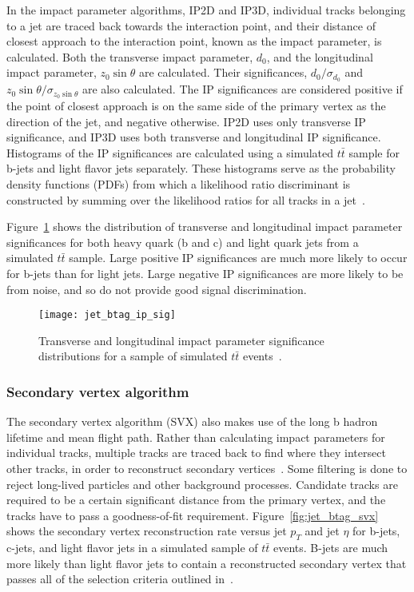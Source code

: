 In the impact parameter algorithms, IP2D and IP3D, individual tracks belonging to a jet are traced back towards the interaction point, and their distance of closest approach to the interaction point, known as the impact parameter, is calculated.
Both the transverse impact parameter, $d_0$, and the longitudinal impact parameter, $z_0 \sin\theta$ are calculated.
Their significances, $d_0/ \sigma_{d_0}$ and $z_0 \sin\theta / \sigma_{z_0 \sin\theta}$ are also calculated.
The IP significances are considered positive if the point of closest approach is on the same side of the primary vertex as the direction of the jet, and negative otherwise.
IP2D uses only transverse IP significance, and IP3D uses both transverse and longitudinal IP significance.
Histograms of the IP significances are calculated using a simulated $t\bar{t}$ sample for b-jets and light flavor jets separately.
These histograms serve as the probability density functions (PDFs) from which a likelihood ratio discriminant is constructed by summing over the likelihood ratios for all tracks in a jet~\cite{jet-bjet-opt}.

Figure~\ref{fig:jet_btag_ip_sig} shows the distribution of transverse and longitudinal impact parameter significances for both heavy quark (b and c) and light quark jets from a simulated $t\bar{t}$ sample.
Large positive IP significances are much more likely to occur for b-jets than for light jets.
Large negative IP significances are more likely to be from noise, and so do not provide good signal discrimination.

\begin{figure}[!ht]
    \centering
\texttt{[image: jet\_btag\_ip\_sig]}
\caption{Transverse and longitudinal impact parameter significance distributions for a sample of simulated $t\bar{t}$
events~\cite{jet-bjet-opt}.}
\label{fig:jet_btag_ip_sig}
\end{figure}

\subsubsection{Secondary vertex algorithm}\label{subsubsec:jet_btag_svx}

The secondary vertex algorithm (SVX) also makes use of the long b hadron lifetime and mean flight path.
Rather than calculating impact parameters for individual tracks, multiple tracks are traced back to find where they
intersect other tracks, in order to reconstruct secondary vertices~\cite{jet-commissioning-b-tagging}.
Some filtering is done to reject long-lived particles and other background processes.
Candidate tracks are required to be a certain significant distance from the primary vertex, and the tracks have to pass a goodness-of-fit requirement.
Figure~\ref{fig:jet_btag_svx} shows the secondary vertex reconstruction rate versus jet $p_T$ and jet $\eta$ for b-jets, c-jets, and light flavor jets in a simulated sample of $t\bar{t}$ events.
B-jets are much more likely than light flavor jets to contain a reconstructed secondary vertex that passes all of the selection criteria outlined in~\cite{jet-bjet-opt}.

